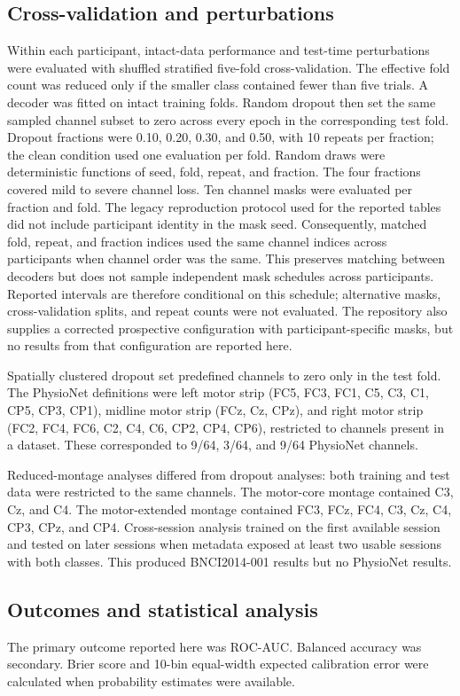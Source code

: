 \documentclass[11pt]{article}
\begin{document}
\subsection{Cross-validation and perturbations}
Within each participant, intact-data performance and test-time perturbations were evaluated with shuffled stratified five-fold cross-validation. The effective fold count was reduced only if the smaller class contained fewer than five trials. A decoder was fitted on intact training folds. Random dropout then set the same sampled channel subset to zero across every epoch in the corresponding test fold. Dropout fractions were 0.10, 0.20, 0.30, and 0.50, with 10 repeats per fraction; the clean condition used one evaluation per fold. Random draws were deterministic functions of seed, fold, repeat, and fraction. The four fractions covered mild to severe channel loss. Ten channel masks were evaluated per fraction and fold. The legacy reproduction protocol used for the reported tables did not include participant identity in the mask seed. Consequently, matched fold, repeat, and fraction indices used the same channel indices across participants when channel order was the same. This preserves matching between decoders but does not sample independent mask schedules across participants. Reported intervals are therefore conditional on this schedule; alternative masks, cross-validation splits, and repeat counts were not evaluated. The repository also supplies a corrected prospective configuration with participant-specific masks, but no results from that configuration are reported here.

Spatially clustered dropout set predefined channels to zero only in the test fold. The PhysioNet definitions were left motor strip (FC5, FC3, FC1, C5, C3, C1, CP5, CP3, CP1), midline motor strip (FCz, Cz, CPz), and right motor strip (FC2, FC4, FC6, C2, C4, C6, CP2, CP4, CP6), restricted to channels present in a dataset. These corresponded to 9/64, 3/64, and 9/64 PhysioNet channels.

Reduced-montage analyses differed from dropout analyses: both training and test data were restricted to the same channels. The motor-core montage contained C3, Cz, and C4. The motor-extended montage contained FC3, FCz, FC4, C3, Cz, C4, CP3, CPz, and CP4. Cross-session analysis trained on the first available session and tested on later sessions when metadata exposed at least two usable sessions with both classes. This produced BNCI2014-001 results but no PhysioNet results.

\subsection{Outcomes and statistical analysis}
The primary outcome reported here was ROC-AUC. Balanced accuracy was secondary. Brier score and 10-bin equal-width expected calibration error were calculated when probability estimates were available.
\end{document}
